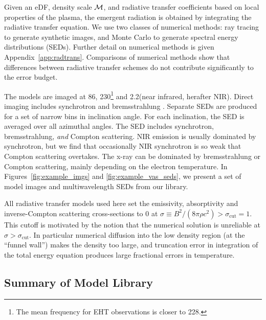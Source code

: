 Given an eDF, density scale $\mathcal{M}$, and radiative transfer coefficients based on local properties of the plasma, the emergent radiation is obtained by integrating the radiative transfer equation.
We use two classes of numerical methods: ray tracing to generate synthetic images, and Monte Carlo to generate spectral energy distributions (SEDs).
Further detail on numerical methods is given Appendix~\ref{app:radtrans}.
Comparisons of numerical methods \citep{2020ApJ...897..148G, Prather_et_al_2022} show that differences between radiative transfer schemes do not contribute significantly to the error budget.

The models are imaged at 86\GHz, 230\GHz\footnote{The mean frequency for  EHT observations is closer to 228\GHz.} and 2.2\um (near infrared, herafter NIR).
Direct imaging includes synchrotron and bremsstrahlung \citep[both ion-electron and electron-electron; see][for a recent review]{2020ApJ...898...50Y}.
Separate SEDs are produced for a set of narrow bins in inclination angle. For each inclination, the SED is averaged over all azimuthal angles.
The SED includes synchrotron, bremsstrahlung, \emph{and} Compton scattering.
NIR emission is usually dominated by synchrotron, but we find that occasionally NIR synchrotron is so weak that Compton scattering overtakes.
The x-ray can be dominated by bremsstrahlung or Compton scattering, mainly depending on the electron temperature.
In Figures~\ref{fig:example_imgs} and \ref{fig:example_vas_seds}, we present a set of model images and multiwavelength SEDs from our library.

All radiative transfer models used here set the emissivity, absorptivity and inverse-Compton scattering cross-sections to $0$ at $\sigma \equiv B^2/(8\pi\rho c^2) > \sigma_\mathrm{cut} = 1$.  This cutoff is motivated by the notion that the numerical solution is unreliable at $\sigma > \sigma_\mathrm{cut}$.  In particular numerical diffusion into the low density region (at the ``funnel wall'') makes the density too large, and truncation error in integration of the total energy equation produces large fractional errors in temperature.

\subsection{Summary of \sgra Model Library}

